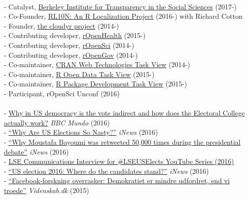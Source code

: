 \documentclass[12pt]{article}
\renewcommand{\section}[1]{\pagebreak[3]%
    \llap{\scshape\smash{\parbox[t]{\marginparwidth}{\raggedright {\color{lg}#1}}}}%
    \vspace{-\baselineskip}\par}
\newcommand{\topic}[1]{\pagebreak[3]\indent {\color{lg}{\footnotesize #1 }}\\}
\newcommand{\subentry}[1]{{\color{lg}-} #1\vspace{.25em}\\}
\begin{document}
\section{Public\\ Engagement}
	\topic{Open Science Evangelism}
		\subentry{Catalyst, \href{http://www.bitss.org/}{Berkeley Institute for Transparency in the Social Sciences} (2017-)}
		\subentry{Co-Founder, \href{http://rl10n.github.io/}{RL10N: An R Localization Project} (2016-) with Richard Cotton}
		\subentry{Founder, \href{http://cloudyr.github.io/}{the cloudyr project} (2014-)}
		\subentry{Contributing developer, \href{http://ropensci.org/}{rOpenHealth} (2015-)}
		\subentry{Contributing developer, \href{http://ropensci.org/}{rOpenSci} (2014-)}
		\subentry{Contributing developer, \href{http://ropengov.github.io/}{rOpenGov} (2014-)}
		\subentry{Co-maintainer, \href{http://cran.r-project.org/web/views/WebTechnologies.html}{CRAN Web Technologies Task View} (2014-)}
		\subentry{Co-maintainer, \href{https://www.github.com/ropensci/opendata}{R Open Data Task View} (2015-)}
		\subentry{Co-maintainer, \href{https://www.github.com/leeper/PackageDevelopment}{R Package Development Task View} (2015-)}
		\subentry{Participant, rOpenSci Unconf (2016)}
	
	\topic{Media Coverage and Interviews}
		\subentry{\href{http://www.bbc.com/mundo/noticias-internacional-37701880}{Why in US democracy is the vote indirect and how does the Electoral College actually work?} \textit{BBC Mundo} (2016)}
		\subentry{\href{https://inews.co.uk/essentials/news/world/us-elections-nasty/}{``Why Are US Elections So Nasty?''} \textit{iNews} (2016)}
		\subentry{\href{https://inews.co.uk/essentials/news/world/moustafa-bayoumi-retweeted-50000-presidential-debate/}{``Why Moustafa Bayoumi was retweeted 50,000 times during the presidential debate''} \textit{iNews} (2016)}
		\subentry{\href{https://www.youtube.com/watch?v=Hwm5V6H_qog&list=PLK4elntcUEy1a8P47lFQDg1oHoNq1BdYk&index=20}{LSE Communications Interview for \#LSEUSElects YouTube Series (2016)}}
		\subentry{\href{https://inews.co.uk/explainers/iq/candidates-stand-us-election-2016/}{``US election 2016: Where do the candidates stand?''} \textit{iNews} (2016)}
		\subentry{\href{http://videnskab.dk/kultur-samfund/facebook-forskning-overrasker-demokratiet-er-mindre-udfordret-end-vi-troede}{``Facebook-forskning overrasker: Demokratiet er mindre udfordret, end vi troede''} \textit{Videnskab.dk} (2015)}
	
\end{document}
